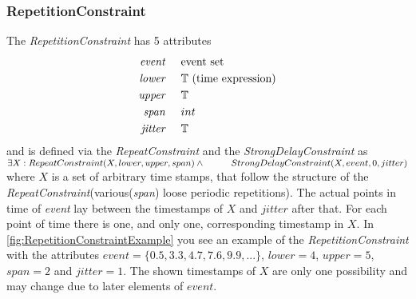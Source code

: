 	\subsubsection{RepetitionConstraint}
		The \emph{RepetitionConstraint} has 5 attributes
		\begin{align*}
			\emph{event} & \hspace{.5cm}\text{event set}\\
			\emph{lower} & \hspace{.5cm}\text{$\mathbb{T}$ (time expression)}\\
			\emph{upper} & \hspace{.5cm}\text{$\mathbb{T}$}\\
			\emph{span}	 & \hspace{.5cm}\text{$int$}\\
			\emph{jitter}& \hspace{.5cm}\mathbb{T}
		\end{align*}
		and is defined via the \emph{RepeatConstraint} and the \emph{StrongDelayConstraint} as\\[10pt]
		\begin{math}
			\exists X: RepeatConstraint(X, lower, upper, span) \land \\
			\text{\hspace{1cm}}StrongDelayConstraint(X, event, 0, jitter)
		\end{math}\\[10pt]
		where $X$ is a set of arbitrary time stamps, that follow the structure of the \emph{RepeatConstraint}(various(\emph{span}) loose periodic repetitions). The actual points in time of \emph{event} lay between the timestamps of $X$ and $jitter$ after that. For each point of time there is one, and only one, corresponding timestamp in $X$.
		In \ref{fig:RepetitionConstraintExample} you see an example of the \emph{RepetitionConstraint} with the attributes $event=\{0.5, 3.3, 4.7, 7.6, 9.9, ...\}$, $lower=4$, $upper=5$, $span=2$ and $jitter=1$. The shown timestamps of $X$ are only one possibility and may change due to later elements of $event$.
		
